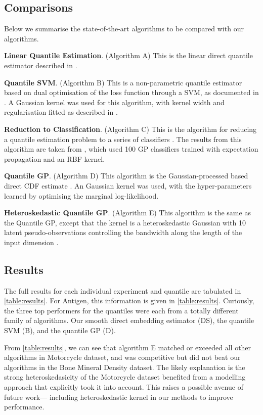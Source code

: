 \documentclass[twoside]{article} \usepackage{aistats2017}
\theoremstyle{definition}
\theoremstyle{theorem}
\begin{document}
	\subsection{Comparisons}
	\label{sec:experiments:comparison}
	
		Below we summarise the state-of-the-art algorithms to be compared with our algorithms.
		
		\textbf{Linear Quantile Estimation}. (Algorithm A) This is the linear direct quantile estimator described in \cite{koenker1978regression}.
		
		\textbf{Quantile SVM}. (Algorithm B) This is a non-parametric quantile estimator based on dual optimisation of the loss function through a SVM, as documented in \cite{takeuchi2006nonparametric}. A Gaussian kernel was used for this algorithm, with kernel width and regularisation fitted as described in \cite{quadrianto2009kernel}.
		
		\textbf{Reduction to Classification}. (Algorithm C) This is the algorithm for reducing a quantile estimation problem to a series of classifiers \citep{langford2012predicting}. The results from this algorithm are taken from \cite{quadrianto2009kernel}, which used 100 GP classifiers trained with expectation propagation and an RBF kernel.
		
		\textbf{Quantile GP}. (Algorithm D) This algorithm is the Gaussian-processed based direct CDF estimate \cite{quadrianto2009kernel}. An Gaussian kernel was used, with the hyper-parameters learned by optimising the marginal log-likelihood.
		
		\textbf{Heteroskedastic Quantile GP}. (Algorithm E) This algorithm is the same as the Quantile GP, except that the kernel is a heteroskedastic Gaussian with 10 latent pseudo-observations controlling the bandwidth along the length of the input dimension \citep{quadrianto2009kernel}. 
		
	\subsection{Results}
	\label{sec:experiments:results}
	
		The full results for each individual experiment and quantile are tabulated in \cref{table:results}. For Antigen, this information is given in \cref{table:results}. Curiously, the three top performers for the quantiles were each from a totally different family of algorithms. Our smooth direct embedding estimator (DS), the quantile SVM (B), and the quantile GP (D).
		
		From \cref{table:results}, we can see that algorithm E matched or exceeded all other algorithms in Motorcycle dataset, and was competitive but did not beat our algorithms in the Bone Mineral Density dataset. The likely explanation is the strong heteroskedasicity of the Motorcycle dataset benefited from a modelling approach that explicitly took it into account. This raises a possible avenue of future work--- including heteroskedastic kernel in our methods to improve performance.


\end{document}
